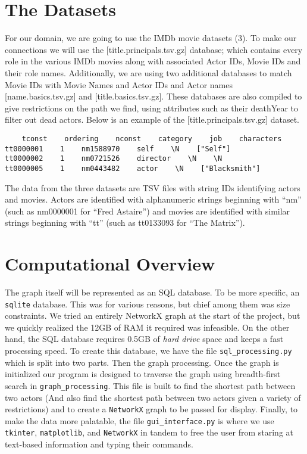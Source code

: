 \documentclass{article}
\begin{document}
\section{The Datasets}
For our domain, we are going to use the IMDb movie datasets (3). To make our connections we will use the [title.principals.tsv.gz] database; which contains every role in the various IMDb movies along with associated Actor IDs, Movie IDs and their role names. Additionally, we are using two additional databases to match Movie IDs with Movie Names and Actor IDs and Actor names [name.basics.tsv.gz] and [title.basics.tsv.gz]. These databases are also compiled to give restrictions on the path we find, using attributes such as their deathYear to filter out dead actors. Below is an example of the [title.principals.tsv.gz] dataset.
\begin{verbatim}
    tconst    ordering    nconst    category    job    characters
tt0000001    1    nm1588970    self    \N    ["Self"]
tt0000002    1    nm0721526    director    \N    \N
tt0000005    1    nm0443482    actor    \N    ["Blacksmith"]
\end{verbatim}
The data from the three datasets are TSV files with string IDs identifying actors and movies. Actors are identified with alphanumeric strings beginning with ``nm” (such as nm0000001 for ``Fred Astaire”) and movies are identified with similar strings beginning with ``tt” (such as tt0133093 for ``The Matrix”).

\section{Computational Overview}
The graph itself will be represented as an SQL database. To be more specific, an \verb+sqlite+ database. This was for various reasons, but chief among them was size constraints. We tried an entirely NetworkX graph at the start of the project, but we quickly realized the 12GB of RAM it required was infeasible. On the other hand, the SQL database requires 0.5GB of \emph{hard drive} space and keeps a fast processing speed. To create this database, we have the file \verb+sql_processing.py+ which is split into two parts. Then the graph processing. Once the graph is initialized our program is designed to traverse the graph using breadth-first search in \verb+graph_processing+. This file is built to find the shortest path between two actors (And also find the shortest path between two actors given a variety of restrictions) and to create a \verb+NetworkX+ graph to be passed for display. Finally, to make the data more palatable, the file \verb+gui_interface.py+ is where we use \verb+tkinter+, \verb+matplotlib+, and \verb+NetworkX+ in tandem to free the user from staring at text-based information and typing their commands.
\end{document}
